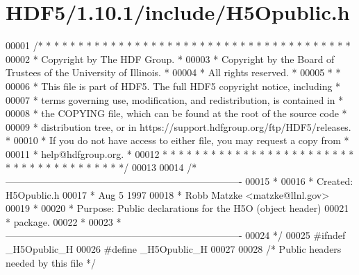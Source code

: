 \hypertarget{_h_d_f5_21_810_81_2include_2_h5_opublic_8h_source}{}\section{H\+D\+F5/1.10.1/include/\+H5\+Opublic.h}
\label{_h_d_f5_21_810_81_2include_2_h5_opublic_8h_source}

\begin{DoxyCode}
00001 \textcolor{comment}{/* * * * * * * * * * * * * * * * * * * * * * * * * * * * * * * * * * * * * * *}
00002 \textcolor{comment}{ * Copyright by The HDF Group.                                               *}
00003 \textcolor{comment}{ * Copyright by the Board of Trustees of the University of Illinois.         *}
00004 \textcolor{comment}{ * All rights reserved.                                                      *}
00005 \textcolor{comment}{ *                                                                           *}
00006 \textcolor{comment}{ * This file is part of HDF5.  The full HDF5 copyright notice, including     *}
00007 \textcolor{comment}{ * terms governing use, modification, and redistribution, is contained in    *}
00008 \textcolor{comment}{ * the COPYING file, which can be found at the root of the source code       *}
00009 \textcolor{comment}{ * distribution tree, or in https://support.hdfgroup.org/ftp/HDF5/releases.  *}
00010 \textcolor{comment}{ * If you do not have access to either file, you may request a copy from     *}
00011 \textcolor{comment}{ * help@hdfgroup.org.                                                        *}
00012 \textcolor{comment}{ * * * * * * * * * * * * * * * * * * * * * * * * * * * * * * * * * * * * * * */}
00013 
00014 \textcolor{comment}{/*-------------------------------------------------------------------------}
00015 \textcolor{comment}{ *}
00016 \textcolor{comment}{ * Created:             H5Opublic.h}
00017 \textcolor{comment}{ *                      Aug  5 1997}
00018 \textcolor{comment}{ *                      Robb Matzke <matzke@llnl.gov>}
00019 \textcolor{comment}{ *}
00020 \textcolor{comment}{ * Purpose:             Public declarations for the H5O (object header)}
00021 \textcolor{comment}{ *                      package.}
00022 \textcolor{comment}{ *}
00023 \textcolor{comment}{ *-------------------------------------------------------------------------}
00024 \textcolor{comment}{ */}
00025 \textcolor{preprocessor}{#ifndef \_H5Opublic\_H}
00026 \textcolor{preprocessor}{#define \_H5Opublic\_H}
00027 
00028 \textcolor{comment}{/* Public headers needed by this file */}

\end{DoxyCode}
